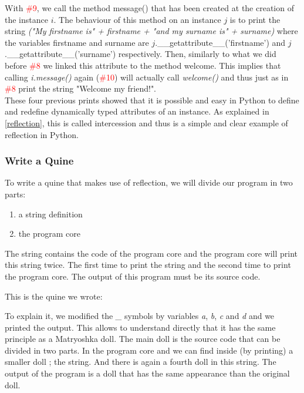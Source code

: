With \textcolor{red}{\#9}, we call the method message() that has been created at the creation of the instance $i$. The behaviour of this method on an instance $j$ is to print the string \emph{("My firstname is" + firstname + "and my surname is" + surname)} where the variables firstname and surname are $j$.\_\_getattribute\_\_(’firstname’) and $j$.\_\_getattribute\_\_(’surname’) respectively. Then, similarly to what we did before \textcolor{red}{\#8} we linked this attribute to the method welcome. This implies that calling \emph{i.message()} again (\textcolor{red}{\#10}) will actually call \emph{welcome()} and thus just as in \textcolor{red}{\#8} print the string "Welcome my friend!".\\

These four previous prints showed that it is possible and easy in Python to define and redefine dynamically typed attributes of an instance. As explained in \ref{reflection}, this is called intercession and thus is a simple and clear example of reflection in Python.\\

\subsubsection{Write a Quine}
To write a quine that makes use of reflection, we will divide our program in two parts:
\begin{enumerate}
    \item a string definition
    \item the program core
\end{enumerate}
The string contains the code of the program core and the program core will print this string twice. The first time to print the string and the second time to print the program core. The output of this program must be its source code.

This is the quine we wrote:


To explain it, we modified the \emph{\_} symbols by variables \emph{a}, \emph{b}, \emph{c} and \emph{d} and we printed the output. This allows to understand directly that it has the same principle as a Matryoshka doll. The main doll is the source code that can be divided in two parts. In the program core and we can find inside (by printing) a smaller doll ; the string. And there is again a fourth doll in this string. The output of the program is a doll that has the same appearance than the original doll.


